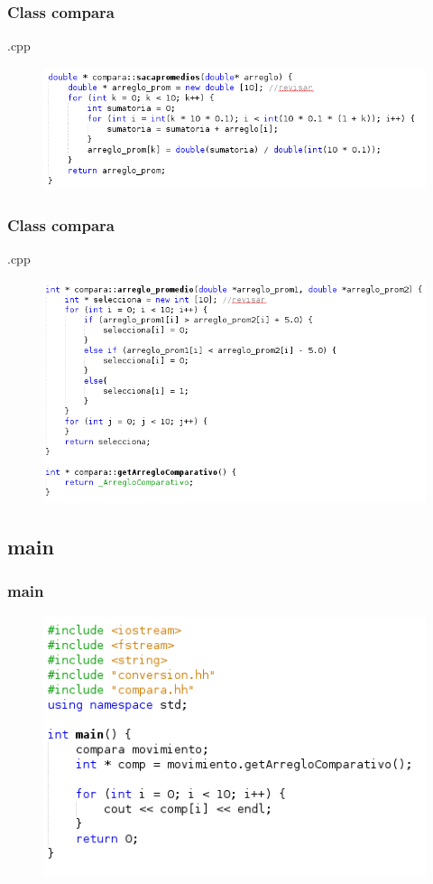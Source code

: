 \documentclass{beamer}
\begin{document}

\begin{frame}
\frametitle{Class compara}
.cpp
\begin{figure}
\includegraphics[width=0.6\linewidth]{21.png}
\end{figure}


\end{frame}


\begin{frame}
\frametitle{Class compara}
.cpp
\begin{figure}
\includegraphics[width=0.6\linewidth]{22.png}
\end{figure}


\end{frame}


\subsection{main}

\begin{frame}
\frametitle{main}

\begin{figure}
\includegraphics[width=0.6\linewidth]{23.png}
\end{figure}


\end{frame}
\end{document}
